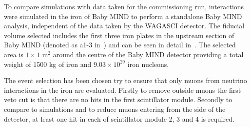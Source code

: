 
To compare simulations with data taken for the commissioning run, interactions were simulated in the iron of Baby MIND to perform a standalone Baby MIND analysis, independent of the data taken by the WAGASCI  detector. The fiducial volume selected includes the first three iron plates in the upstream section of Baby MIND (denoted as a1-3 in~) and can be seen in detail in~. The selected area is $1 \times 1$ m$^2$ around the centre of the Baby MIND detector providing a total weight of 1500 kg of iron and $9.03 \times 10^{29}$ iron nucleons.

The event selection has been chosen try to ensure that only muons from neutrino interactions in the iron are evaluated. Firstly to remove outside muons the first veto cut is that there are no hits in the first scintillator module. Secondly to compare to simulations and to reduce muons entering from the side of the detector, at least one hit in each of scintillator module 2, 3 and 4 is required.



